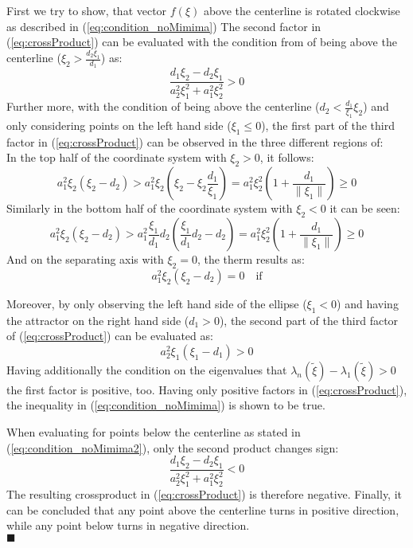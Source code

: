 First we try to show, that vector $f(\xi)$ above the centerline is rotated clockwise as described in (\ref{eq:condition_noMimima})
The second factor in (\ref{eq:crossProduct}) can be evaluated with the condition from of being above the centerline ($\xi_2 > \frac{d_2 \xi_1}{d_1}$) as:
\begin{equation}
 \frac{d_1\xi_2 - d_2 \xi_1}{a_2^2 \xi_1^2 + a_1^2 \xi_2^2} > 0
\end{equation}
Further more, with the condition of being above the centerline ($d_2 < \frac{d_1}{\xi_1} \xi_2$) and only considering points on the left hand side ($\xi_1 \leq 0$), the first part of the third factor in (\ref{eq:crossProduct}) can be observed in the three different regions of: \\
In the top half of the coordinate system with $\xi_2 > 0$, it follows:
\begin{equation}
  a_1^2\xi_2(\xi_2 - d_2) > a_1^2\xi_2(\xi_2 - \xi_2 \frac{d_1}{\xi_1}) = a_1^2 \xi_2^2(1+\frac{d_1}{\| \xi_1\|}) \geq 0
\end{equation}
Similarly in the bottom half of the coordinate system with $\xi_2 < 0$ it can be seen:
\begin{equation}
a_1^2\xi_2(\xi_2 - d_2) > a_1^2 \frac{\xi_1}{d_1}d_2(\frac{\xi_1}{d_1}d_2 - d_2) = a_1^2 \xi_2^2(1+\frac{d_1}{\| \xi_1\|}) \geq 0
\end{equation}
And on the separating axis with $\xi_2 = 0$, the therm results as:
\begin{equation}
a_1^2\xi_2(\xi_2 - d_2) = 0  \quad \text{if}
\end{equation}

Moreover, by only observing the left hand side of the ellipse ($\xi_1 < 0$) and having the attractor on the right hand side ($d_1 > 0$), the second part of the third factor of (\ref{eq:crossProduct}) can be  evaluated as:
\begin{equation}
  a_2^2 \xi_1 (\xi_1 - d_1)  > 0
\end{equation}
Having additionally the condition on the eigenvalues that $ \lambda_n(\tilde \xi) - \lambda_{1}(\tilde \xi) > 0$ the first factor is positive, too. Having only positive factors in (\ref{eq:crossProduct}), the inequality in (\ref{eq:condition_noMimima}) is shown to be true.


When evaluating for points below the centerline as stated in (\ref{eq:condition_noMimima2}), only the second product changes sign:
\begin{equation}
\frac{d_1\xi_2 - d_2 \xi_1}{a_2^2 \xi_1^2 + a_1^2 \xi_2^2} < 0
\end{equation}
The resulting crossproduct in (\ref{eq:crossProduct}) is therefore negative. Finally, it can be concluded that any point above the centerline turns in positive direction, while any point below turns in negative direction. \\
\hfill $\blacksquare$





